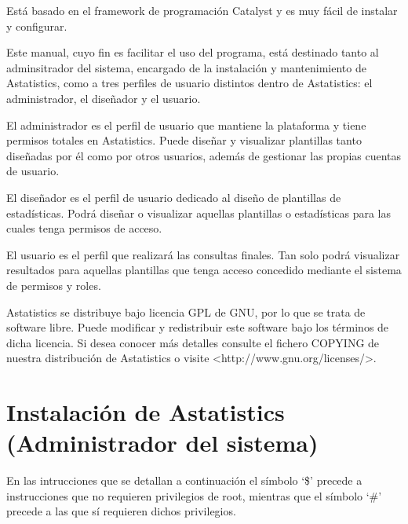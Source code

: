 \documentclass[spanish,12pt]{book}
\begin{document}
Está basado en el framework de programación Catalyst y es muy fácil de instalar y configurar.

Este manual, cuyo fin es facilitar el uso del programa, está destinado tanto al adminsitrador del sistema, encargado de la instalación y mantenimiento de Astatistics, como a tres perfiles de usuario distintos dentro de Astatistics: el administrador, el diseñador y el usuario.

El administrador es el perfil de usuario que mantiene la plataforma y tiene permisos totales en Astatistics. Puede diseñar y visualizar plantillas tanto diseñadas por él como por otros usuarios, además de gestionar las propias cuentas de usuario.

El diseñador es el perfil de usuario dedicado al diseño de plantillas de estadísticas. Podrá diseñar o visualizar aquellas plantillas o estadísticas para las cuales tenga permisos de acceso.

El usuario es el perfil que realizará las consultas finales. Tan solo podrá visualizar resultados para aquellas plantillas que tenga acceso concedido mediante el sistema de permisos y roles.

Astatistics se distribuye bajo licencia GPL de GNU, por lo que se trata de software libre. Puede modificar y redistribuir este software bajo los términos de dicha licencia. Si desea conocer más detalles consulte el fichero COPYING de nuestra distribución de Astatistics o visite {\textless}http://www.gnu.org/licenses/\textgreater.

\chapter{Instalación de Astatistics (Administrador del sistema)}
En las intrucciones que se detallan a continuación el símbolo `\$' precede a instrucciones que no requieren privilegios de root, mientras que el símbolo `\#' precede a las que sí requieren dichos privilegios.
\end{document}
